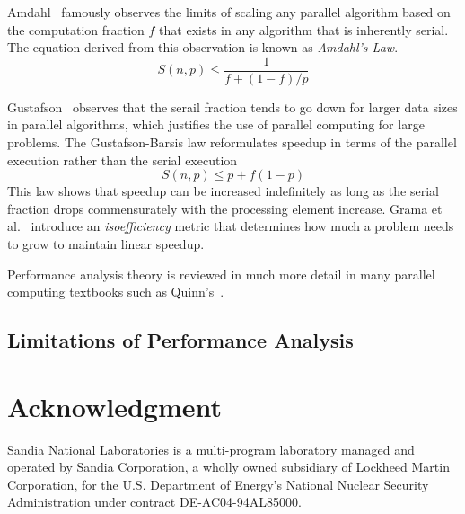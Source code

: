 \documentclass[conference]{IEEEtran}
\newcommand*{\lcite}[1]{~\cite{#1}}
\newcommand{\etal}{et al.}
\newcommand*{\keyterm}[1]{\emph{#1}}
\begin{document}
Amdahl\lcite{Amdahl1967} famously observes the limits of scaling any
parallel algorithm based on the computation fraction $f$ that exists in any
algorithm that is inherently serial. The equation derived from this
observation is known as \keyterm{Amdahl's Law}.
\begin{equation}
  S(n,p) \leq \frac{1}{f + (1-f)/p}
  \label{eq:Amdahl}
\end{equation}

Gustafson\lcite{Gustafson1988} observes that the serail fraction tends to
go down for larger data sizes in parallel algorithms, which justifies the
use of parallel computing for large problems. The Gustafson-Barsis law
reformulates speedup in terms of the parallel execution rather than the
serial execution
\begin{equation}
  S(n,p) \leq p + f(1-p)
  \label{eq:GustafsonBarsis}
\end{equation}
This law shows that speedup can be increased indefinitely as
long as the serial fraction drops commensurately with the processing
element increase. Grama \etal\lcite{Grama1993} introduce an
\keyterm{isoefficiency} metric that determines how much a problem needs to
grow to maintain linear speedup.

Performance analysis theory is reviewed in much more detail in many
parallel computing textbooks such as Quinn's\lcite{Quinn2004}.

\subsection{Limitations of Performance Analysis}


\section*{Acknowledgment}

\noindent
Sandia National Laboratories is a multi-program laboratory managed and
operated by Sandia Corporation, a wholly owned subsidiary of Lockheed
Martin Corporation, for the U.S. Department of Energy's National Nuclear
Security Administration under contract DE-AC04-94AL85000.



\end{document}

